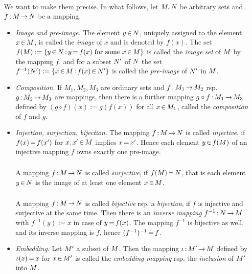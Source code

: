\documentclass[11pt,twoside]{article}
\begin{document}
\paragraph{}
We want to make them precise.
In what follows, let $M, N$ be arbitrary sets
and $f {\,:\,} M {\,\to\,} N$ be a mapping.

\begin{itemize}[leftmargin=15pt]
\item[1.] \textit{Image and pre-image.}
The element $y {\,\in\,} N$,
uniquely assigned to the element $x {\,\in\,} M$,
is called the \textit{image} of $x$ and is denoted by $f(x)$.
The set
$f(M) := \{ y {\,\in\,} N {\,:\,} y {\,=\,} f(x) \mbox{ for some } x {\,\in\,} M \}$
is called the \textit{image set} of $M$ by the mapping $f$,
and for a subset $N'$ of $N$ the set
$f^{-1}(N') := \{x {\,\in\,} M {\,:\,} f(x) {\,\in\,} N'\}$
is called the \textit{pre-image} of $N'$ in $M$.

\item[2.] \textit{Composition.}
If $M_1,M_2,M_3$ are ordinary sets and $f {\,:\,} M_1 {\,\to\,} M_2$ rsp.
$g {\,:\,} M_2 {\,\to\,} M_3$ are mappings,
then there is a further mapping $g \circ f {\,:\,} M_1 {\,\to\,} M_3$ defined by
$(g \circ f)(x) := g(f(x))$ for all $x {\,\in\,} M_1$,
called the \textit{composition} of $f$ and $g$.

\item[3.] \textit{Injection, surjection, bijection.}
The mapping $f {\,:\,} M {\,\to\,} N$ is called \textit{injective},
if $f(x) {\,=\,} f(x')$ for $x,x' {\,\in\,} M$ implies $x {\,=\,} x'$.
Hence each element $y {\,\in\,} f(M)$ of an injective mapping $f$
owns exactly one pre-image.

\subparagraph*{}
A mapping $f {\,:\,} M {\,\to\,} N$ is called \textit{surjective},
if $f(M) {\,=\,} N$,
that is
each element $y {\,\in\,} N$ is the image
of at least one element $x {\,\in\,} M$.

\subparagraph*{}
A mapping $f {\,:\,} M {\,\to\,} N$
is called \textit{bijective} rsp. a \textit{bijection}, 
if $f$ is injective and surjective at the same time.
Then there is an \textit{inverse mapping}
$f^{-1} {\,:\,} N {\,\to\,} M$ with $f^{-1}(y) := x$ in case of $y {\,=\,} f(x)$. 
The mapping $f^{-1}$ is bijective as well,
and its inverse mapping is $f$,
hence $(f^{-1})^{-1} {\,=\,} f$.

\item[4.] \textit{Embedding.}
Let $M'$ a subset of $M$.
Then the mapping $\iota {\,:\,} M' {\,\to\,} M$ defined by
$\iota(x) {\,=\,} x$ for $x {\,\in\,} M'$ 
is called the \textit{embedding mapping} rsp. the \textit{inclusion}
of $M'$ into $M$.


\end{itemize}
\end{document}
